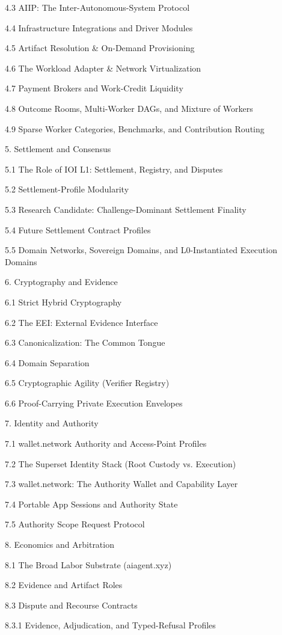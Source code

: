 \documentclass[
  11pt,
]{article}
\begin{document}
4.3 AIIP: The Inter-Autonomous-System Protocol

4.4 Infrastructure Integrations and Driver Modules

4.5 Artifact Resolution \& On-Demand Provisioning

4.6 The Workload Adapter \& Network Virtualization

4.7 Payment Brokers and Work-Credit Liquidity

4.8 Outcome Rooms, Multi-Worker DAGs, and Mixture of Workers

4.9 Sparse Worker Categories, Benchmarks, and Contribution Routing

5. Settlement and Consensus

5.1 The Role of IOI L1: Settlement, Registry, and Disputes

5.2 Settlement-Profile Modularity

5.3 Research Candidate: Challenge-Dominant Settlement Finality

5.4 Future Settlement Contract Profiles

5.5 Domain Networks, Sovereign Domains, and L0-Instantiated Execution
Domains

6. Cryptography and Evidence

6.1 Strict Hybrid Cryptography

6.2 The EEI: External Evidence Interface

6.3 Canonicalization: The Common Tongue

6.4 Domain Separation

6.5 Cryptographic Agility (Verifier Registry)

6.6 Proof-Carrying Private Execution Envelopes

7. Identity and Authority

7.1 wallet.network Authority and Access-Point Profiles

7.2 The Superset Identity Stack (Root Custody vs. Execution)

7.3 wallet.network: The Authority Wallet and Capability Layer

7.4 Portable App Sessions and Authority State

7.5 Authority Scope Request Protocol

8. Economics and Arbitration

8.1 The Broad Labor Substrate (aiagent.xyz)

8.2 Evidence and Artifact Roles

8.3 Dispute and Recourse Contracts

8.3.1 Evidence, Adjudication, and Typed-Refusal Profiles
\end{document}
